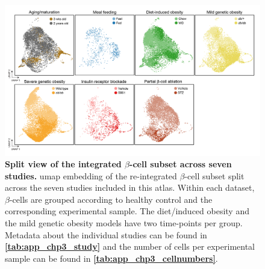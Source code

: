 \begin{figure}[H]
\centering
\includegraphics[width=\linewidth]{Appendix2/Fig/F3-4-01.png}
\caption[Split view of the integrated $\beta$-cell subset across seven studies]{\textbf{Split view of the integrated $\beta$-cell subset across seven studies.} \gls{umap} embedding of the re-integrated $\beta$-cell subset split across the seven studies included in this atlas. Within each dataset, $\beta$-cells are grouped according to healthy control and the corresponding experimental sample. The diet/induced obesity and the mild genetic obesity models have two time-points per group. Metadata about the individual studies can be found in \textbf{\autoref{tab:app_chp3_study}} and the number of cells per experimental sample can be found in \textbf{\autoref{tab:app_chp3_cellnumbers}}.}
\label{fig:app_chp3_betastudy}
\end{figure}




